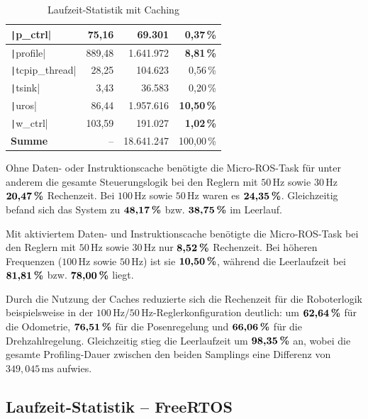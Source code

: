 \begin{table}[H]
{{\begin{minipage}[b]{0.50\hsize}
\begin{tabular}{|l|r|r|r|}
        \texttt|p_ctrl| & 75,16 & 69.301 & \textbf{0,37\,\%} \\ \hline
        \texttt|profile| & 889,48 & 1.641.972 & \textbf{8,81\,\%} \\ \hline
        \texttt|tcpip_thread| & 28,25 & 104.623 & 0,56\,\% \\ \hline
        \texttt|tsink| & 3,43 & 36.583 & 0,20\,\% \\ \hline
        \texttt|uros| & 86,44 & 1.957.616 & \textbf{10,50\,\%} \\ \hline
        \texttt|w_ctrl| & 103,59 & 191.027 & \textbf{1,02\,\%} \\ \hline
        \hline
        \textbf{Summe} & -- & 18.641.247 & 100,00\,\% \\ \hline
        \end{tabular}
        \caption{Laufzeit-Statistik mit Caching}
    \end{minipage}
}}
\end{table}

Ohne Daten- oder Instruktionscache benötigte die Micro-ROS-Task für unter
anderem die gesamte Steuerungslogik bei den Reglern mit $50\,\text{Hz}$ sowie
$30\,\text{Hz}$ $\textbf{20,47\,\%}$ Rechenzeit. Bei $100\,\text{Hz}$ sowie
$50\,\text{Hz}$ waren es $\textbf{24,35\,\%}$. Gleichzeitig befand sich das
System zu $\textbf{48,17\,\%}$ bzw. $\textbf{38,75\,\%}$ im Leerlauf.

Mit aktiviertem Daten- und Instruktionscache benötigte die Micro-ROS-Task bei
den Reglern mit $50\,\text{Hz}$ sowie $30\,\text{Hz}$ nur $\textbf{8,52\,\%}$
Rechenzeit. Bei höheren Frequenzen ($100\,\text{Hz}$ sowie $50\,\text{Hz}$) ist
sie $\textbf{10,50\,\%}$, während die Leerlaufzeit bei $\textbf{81,81\,\%}$ bzw.
$\textbf{78,00\,\%}$ liegt.

Durch die Nutzung der Caches reduzierte sich die Rechenzeit für die Roboterlogik
beispielsweise in der $100\,\text{Hz}/50\,\text{Hz}$-Reglerkonfiguration
deutlich: um $\textbf{62,64\,\%}$ für die Odometrie, $\textbf{76,51\,\%}$ für
die Posenregelung und $\textbf{66,06\,\%}$ für die Drehzahlregelung.
Gleichzeitig stieg die Leerlaufzeit um $\textbf{98,35\,\%}$ an, wobei die
gesamte Profiling-Dauer zwischen den beiden Samplings eine Differenz von
$349,\!045\,\text{ms}$ aufwies.

\subsection{Laufzeit-Statistik -- FreeRTOS}

